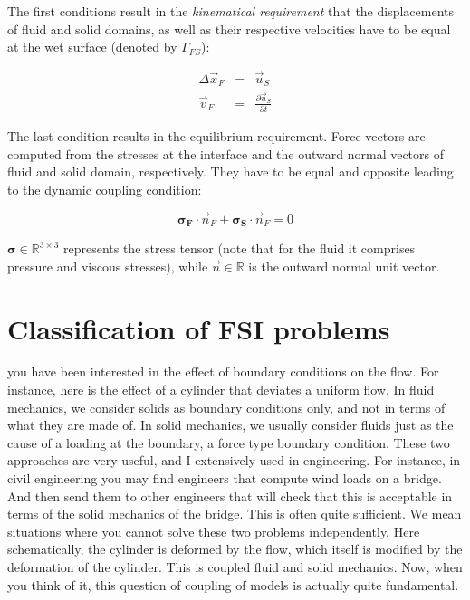 The first conditions result in the \textit{kinematical requirement} that the displacements of fluid and solid domains, as well as their respective velocities have to be equal at the wet surface (denoted by $\Gamma_{FS}$): 

\begin{eqnarray}
 \Delta\vec{x}_F &=& \vec{u}_S \\
 \vec{v}_F &=& \frac{\partial \vec{u}_S}{\partial t}
\end{eqnarray}

The last condition results in the equilibrium requirement. Force vectors are computed from the stresses at the interface and the outward normal vectors of fluid and solid domain, respectively. They have to be equal and opposite leading to the dynamic coupling condition:

\begin{equation}
\bm{\sigma_F} \cdot \vec{n}_F + \bm{\sigma_S} \cdot \vec{n}_F = 0
\end{equation}

$\bm{\sigma} \in \mathbb{R}^{3 \times 3}$ represents the stress tensor (note that for the fluid it comprises pressure and viscous stresses), while $\vec{n} \in \mathbb{R}$ is the outward normal unit vector.


\section{Classification of FSI problems}
\label{sec:classification}
you have been interested in the effect of boundary conditions on the flow. For instance, here is the effect of a cylinder that deviates a uniform flow. In fluid mechanics, we consider solids as boundary conditions only,
and not in terms of what they are made of.
In solid mechanics, we usually consider fluids just as the cause of a loading at the boundary, a force type boundary condition. These two approaches are very useful, and I extensively used in engineering. For instance, in civil engineering you may find engineers that compute wind loads on a bridge. And then send them to other engineers that will check that this is acceptable in terms of the solid mechanics of the bridge. This is often quite sufficient.
We mean situations where you cannot solve these two problems independently.
Here schematically, the cylinder is deformed by the flow, which itself is modified by the deformation of the cylinder. This is coupled fluid and solid mechanics. Now, when you think of it, this question of coupling of models is actually quite fundamental.

